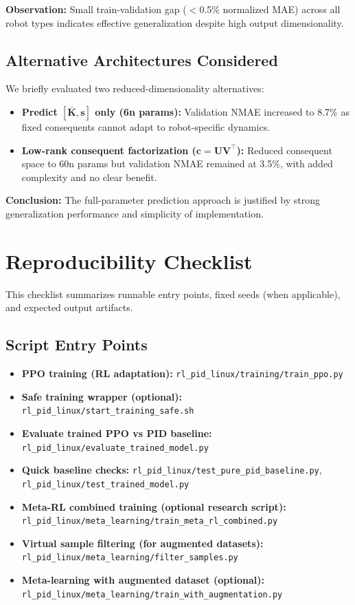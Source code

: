 \documentclass[a4paper]{cas-sc}
\begin{document}
\textbf{Observation:} Small train-validation gap ($<$0.5\% normalized MAE) across all robot types indicates effective generalization despite high output dimensionality.

\subsection{Alternative Architectures Considered}

We briefly evaluated two reduced-dimensionality alternatives:
\begin{itemize}[leftmargin=*, itemsep=1pt]
    \item \textbf{Predict $[\bar{\bm{K}}, \bm{s}]$ only (6n params):} Validation NMAE increased to 8.7\% as fixed consequents cannot adapt to robot-specific dynamics.
    \item \textbf{Low-rank consequent factorization ($\bm{c} = \bm{U}\bm{V}^\top$):} Reduced consequent space to 60n params but validation NMAE remained at 3.5\%, with added complexity and no clear benefit.
\end{itemize}

\textbf{Conclusion:} The full-parameter prediction approach is justified by strong generalization performance and simplicity of implementation.

\newpage
\section{Reproducibility Checklist}
\label{app:repro_checklist}

This checklist summarizes runnable entry points, fixed seeds (when applicable), and expected output artifacts.

\subsection{Script Entry Points}
\begin{itemize}[leftmargin=*, itemsep=2pt]
    \item \textbf{PPO training (RL adaptation):} \texttt{rl\_pid\_linux/training/train\_ppo.py}
    \item \textbf{Safe training wrapper (optional):} \texttt{rl\_pid\_linux/start\_training\_safe.sh}
    \item \textbf{Evaluate trained PPO vs PID baseline:} \texttt{rl\_pid\_linux/evaluate\_trained\_model.py}
    \item \textbf{Quick baseline checks:} \texttt{rl\_pid\_linux/test\_pure\_pid\_baseline.py}, \texttt{rl\_pid\_linux/test\_trained\_model.py}
    \item \textbf{Meta-RL combined training (optional research script):} \texttt{rl\_pid\_linux/meta\_learning/train\_meta\_rl\_combined.py}
    \item \textbf{Virtual sample filtering (for augmented datasets):} \texttt{rl\_pid\_linux/meta\_learning/filter\_samples.py}
    \item \textbf{Meta-learning with augmented dataset (optional):} \texttt{rl\_pid\_linux/meta\_learning/train\_with\_augmentation.py}
\end{itemize}
\end{document}
